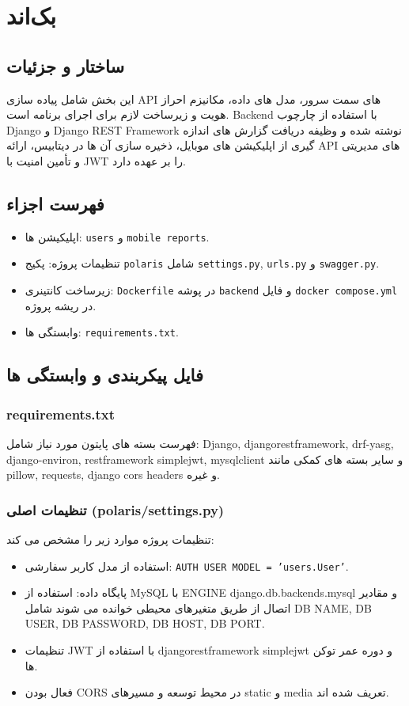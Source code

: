 \chapter{بک‌اند}
\section{ساختار و جزئیات }
این بخش شامل پیاده سازی API های سمت سرور، مدل های داده، مکانیزم احراز هویت و زیرساخت لازم برای اجرای برنامه است. Backend با استفاده از چارچوب Django و Django REST Framework نوشته شده و وظیفه دریافت گزارش های اندازه گیری از اپلیکیشن های موبایل، ذخیره سازی آن ها در دیتابیس، ارائه API های مدیریتی و تأمین امنیت با JWT را بر عهده دارد.

\section{فهرست اجزاء}
\begin{itemize}
  \item اپلیکیشن ها: \texttt{users} و \texttt{mobile reports}.
  \item تنظیمات پروژه: پکیج \texttt{polaris} شامل \texttt{settings.py}, \texttt{urls.py} و \texttt{swagger.py}.
  \item زیرساخت کانتینری: \texttt{Dockerfile} در پوشه \texttt{backend} و فایل \texttt{docker compose.yml} در ریشه پروژه.
  \item وابستگی ها: \texttt{requirements.txt}.
\end{itemize}

\section{فایل پیکربندی و وابستگی ها}
\subsection{requirements.txt}
فهرست بسته های پایتون مورد نیاز شامل:
Django, djangorestframework, drf-yasg, django-environ, restframework simplejwt, mysqlclient و سایر بسته های کمکی مانند pillow, requests, django cors headers و غیره.

\subsection{تنظیمات اصلی (polaris/settings.py)}
تنظیمات پروژه موارد زیر را مشخص می کند:
\begin{itemize}
  \item استفاده از مدل کاربر سفارشی: \texttt{AUTH USER MODEL = 'users.User'}.
  \item پایگاه داده: استفاده از MySQL با ENGINE django.db.backends.mysql و مقادیر اتصال از طریق متغیرهای محیطی خوانده می شوند شامل DB NAME, DB USER, DB PASSWORD, DB HOST, DB PORT.
  \item تنظیمات JWT با استفاده از djangorestframework simplejwt و دوره عمر توکن ها.
  \item فعال بودن CORS در محیط توسعه و مسیرهای static و media تعریف شده اند.
\end{itemize}

